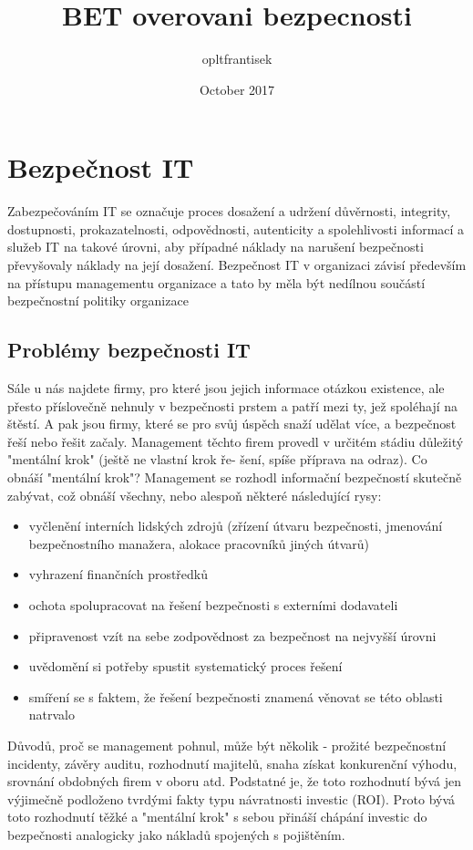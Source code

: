 \documentclass{article}
\title{BET overovani bezpecnosti}
\author{opltfrantisek }
\date{October 2017}
\begin{document}
\maketitle
\tableofcontents
\section{Bezpečnost IT}
Zabezpečováním IT se označuje proces dosažení a udržení důvěrnosti, integrity, dostupnosti,
prokazatelnosti, odpovědnosti, autenticity a spolehlivosti informací a služeb IT na takové úrovni, aby
případné náklady na narušení bezpečnosti převyšovaly náklady na její dosažení. Bezpečnost IT v organizaci
závisí především na přístupu managementu organizace a tato by měla být nedílnou součástí
bezpečnostní politiky organizace
\subsection{Problémy bezpečnosti IT}
 Sále u nás najdete firmy,
pro které jsou jejich informace otázkou existence, ale přesto příslovečně nehnuly v bezpečnosti
prstem a patří mezi ty, jež spoléhají na štěstí.
A pak jsou firmy, které se pro svůj úspěch snaží udělat více, a bezpečnost řeší nebo řešit začaly.
Management těchto firem provedl v určitém stádiu důležitý "mentální krok" (ještě ne vlastní krok ře-
šení, spíše příprava na odraz).
Co obnáší "mentální krok"? Management se rozhodl informační bezpečností skutečně zabývat,
což obnáší všechny, nebo alespoň některé následující rysy:
\begin{itemize}
    \item vyčlenění interních lidských zdrojů (zřízení útvaru bezpečnosti, jmenování bezpečnostního
manažera, alokace pracovníků jiných útvarů)
    \item vyhrazení finančních prostředků
    \item ochota spolupracovat na řešení bezpečnosti s externími dodavateli
    \item připravenost vzít na sebe zodpovědnost za bezpečnost na nejvyšší úrovni
    \item uvědomění si potřeby spustit systematický proces řešení
    \item smíření se s faktem, že řešení bezpečnosti znamená věnovat se této oblasti natrvalo
\end{itemize}
Důvodů, proč se management pohnul, může být několik - prožité bezpečnostní incidenty,
závěry auditu, rozhodnutí majitelů, snaha získat konkurenční
výhodu, srovnání obdobných firem v oboru atd. Podstatné je, že toto rozhodnutí bývá jen výjimečně
podloženo tvrdými fakty typu návratnosti investic (ROI). Proto bývá toto rozhodnutí těžké
a "mentální krok" s sebou přináší chápání investic do bezpečnosti analogicky jako nákladů spojených
s pojištěním.
\end{document}
